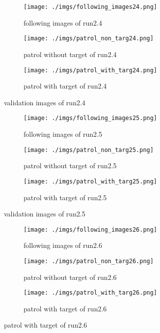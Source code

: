 \documentclass[paper=a4, fontsize=11pt]{scrartcl} %
\numberwithin{equation}{section} %
\numberwithin{figure}{section} %
\numberwithin{table}{section} %
\begin{document}
\begin{enumerate}
\begin{itemize}
{ \begin{figure}[ht]
	 \begin{subfigure}{0.33\textwidth}
	 \texttt{[image: ./imgs/following\_images24.png]} 
	 \caption{following images of run2.4}
	 \label{fig:subfollowing_images24}
	 \end{subfigure}
	 \begin{subfigure}{0.33\textwidth}
	 \texttt{[image: ./imgs/patrol\_non\_targ24.png]}
	 \caption{patrol without target of run2.4}
	 \label{fig:subpatrol_non_targ24}
	 \end{subfigure}
	 \begin{subfigure}{0.33\textwidth}
	 \texttt{[image: ./imgs/patrol\_with\_targ24.png]}
	 \caption{patrol with target of run2.4}
	 \label{fig:subpatrol_with_targ24}
	 \end{subfigure}
 
	 \caption{validation images of run2.4}
	 \label{fig:outputimages24}
 \end{figure}


 \begin{figure}[ht]
	\begin{subfigure}{0.33\textwidth}
	\texttt{[image: ./imgs/following\_images25.png]} 
	\caption{following images of run2.5}
	\label{fig:subfollowing_images25}
	\end{subfigure}
	\begin{subfigure}{0.33\textwidth}
	\texttt{[image: ./imgs/patrol\_non\_targ25.png]}
	\caption{patrol without target of run2.5}
	\label{fig:subpatrol_non_targ25}
	\end{subfigure}
	\begin{subfigure}{0.33\textwidth}
	\texttt{[image: ./imgs/patrol\_with\_targ25.png]}
	\caption{patrol with target of run2.5}
	\label{fig:subpatrol_with_targ25}
	\end{subfigure}

	\caption{validation images of run2.5}
	\label{fig:outputimages25}
\end{figure}

\begin{figure}[ht]
	\begin{subfigure}{0.33\textwidth}
	\texttt{[image: ./imgs/following\_images26.png]} 
	\caption{following images of run2.6}
	\label{fig:subfollowing_images26}
	\end{subfigure}
	\begin{subfigure}{0.33\textwidth}
	\texttt{[image: ./imgs/patrol\_non\_targ26.png]}
	\caption{patrol without target of run2.6}
	\label{fig:subpatrol_non_targ26}
	\end{subfigure}
	\begin{subfigure}{0.33\textwidth}
	\texttt{[image: ./imgs/patrol\_with\_targ26.png]}
	\caption{patrol with target of run2.6}
	\label{fig:subpatrol_with_targ26}
	\end{subfigure}


\end{figure}}
\end{itemize}
\end{enumerate}
\end{document}

